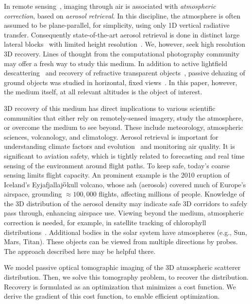 \documentclass[10pt,twocolumn,letterpaper]{article}
\begin{document}
In remote sensing~\cite{diner,kokhan}, imaging through air is associated with {\em atmospheric correction}, based on {\em aerosol retrieval}. In this discipline, the atmosphere is often assumed to be plane-parallel, for simplicity, using only 1D vertical radiative transfer. Consequently state-of-the-art aerosol retrieval is done in distinct large lateral blocks~\cite{matronchik} with limited height resolution~\cite{kalashnikova}. We, however, seek high resolution 3D recovery. Lines of thought from the computational photography community may offer a fresh way to study this medium. In addition to active lightfield descattering~\cite{fuchs,kim,levoy} and recovery of refractive transparent objects~\cite{ihrke}, passive dehazing of ground objects was studied in horizontal, fixed views~\cite{fattal,he,kopf,kratz,narasimhan2,oakley,Hschechner2,tan}. In this paper, however, the medium itself, at all relevant altitudes is the object of interest.



3D recovery of this medium has direct implications to various scientific communities that either rely on remotely-sensed imagery, study the atmosphere, or overcome the medium to see beyond. These include meteorology, atmospheric sciences, volcanology, and climatology.
Aerosol retrieval %
is important for %
understanding climate factors and evolution~\cite{chud,dayan,kalashnikova} and
monitoring air quality. It is significant to aviation safety, which is tightly related to forecasting and real time sensing of the environment around flight
paths. To keep safe, today's coarse sensing limits flight capacity. An prominent example is the 2010 eruption of Iceland's
Eyjafjallaj$\ddot {\rm o}$kull volcano, whose ash (aerosols) covered much of Europe's airspace, grounding $\approx 100,000$ flights, affecting millions of people. Knowledge of the 3D distribution of the aerosol density may indicate safe 3D corridors to safely pass through, enhancing airspace use. Viewing beyond the medium, atmospheric correction is needed, for example, in satellite tracking of chlorophyll distributions~\cite{chang,johnsen,levy,moses}. Additional bodies in the solar system have atmospheres (e.g., Sun, Mars, Titan). These objects can be viewed from multiple directions by probes.
The approach described here may be helpful there.

We model passive optical tomographic imaging of the 3D atmospheric scatterer distribution. Then, we solve this tomography problem, to recover the distribution. Recovery is formulated as an optimization that minimizes a cost function. We derive the gradient of this cost function, to enable efficient optimization.
\end{document}
